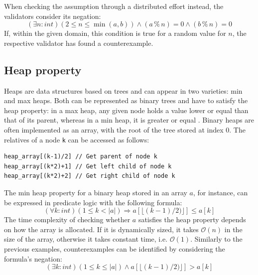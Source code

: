 When checking the assumption through a distributed effort instead, the validators consider its negation:
\begin{equation}\label{eq:coprime-existential}
    (\exists n : int) (2 \le n \le \min(a,b)) \land (a \mathbin{\%} n) = 0 \land (b \mathbin{\%} n) = 0
\end{equation}
If, within the given domain, this condition is true for a random value for $n$, the respective validator has found a counterexample.

\subsection{Heap property}
Heaps \cite{dict_heap} are data structures based on trees and can appear in two varieties: min and max heaps. Both can be represented as binary trees and have to satisfy the heap property: in a max heap, any given node holds a value lower or equal than that of its parent, whereas in a min heap, it is greater or equal \cite{dict_heap_property}. Binary heaps are often implemented as an array, with the root of the tree stored at index 0. The relatives of a node \texttt{k} can be accessed as follows:
\begin{lstlisting}[language=Solidity, numbers=none, caption=Access a binary heap in array representation]
heap_array[(k-1)/2] // Get parent of node k
heap_array[(k*2)+1] // Get left child of node k
heap_array[(k*2)+2] // Get right child of node k
\end{lstlisting}
The min heap property for a binary heap stored in an array $a$, for instance, can be expressed in predicate logic with the following formula:
\begin{equation}\label{eq:heap-unversial}
  (\forall k : int) (1 \le k < |a|) \Rightarrow a[\lfloor(k-1)/2)\rfloor] \le a[k]
\end{equation}
The time complexity of checking whether $a$ satisfies the heap property depends on how the array is allocated. If it is dynamically sized, it takes $\mathcal{O}(n)$ in the size of the array, otherwise it takes constant time, i.e. $\mathcal{O}(1)$.  Similarly to the previous examples, counterexamples can be identified by considering the formula's negation:
\begin{equation}\label{eq:heap-unversial-neg}
  (\exists k : int) (1 \le k \le |a|) \land a[\lfloor(k-1)/2)\rfloor] > a[k]
\end{equation}

